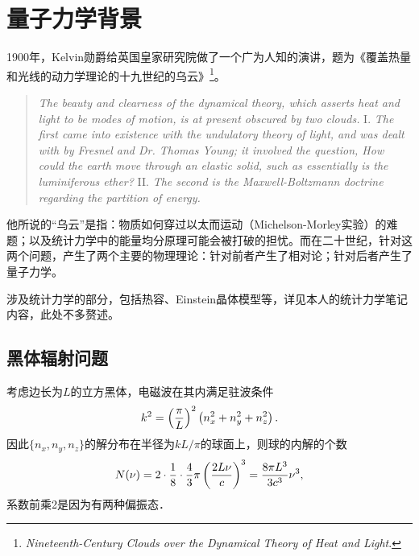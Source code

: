\def\coursename{量子力学}
\def\courseEnglishname{Quantum Mechanics}
\def\teachername{陈新、郭永}
\def\beginday{2022/3/25}



\lecturedeclaretrue

\let\oldr\r
\renewcommand*{\r}{\bm r}						%
\newcommand{\qo}[1]{\bm{\hat #1}\!\mathop{}}	%
\newcommand{\cmm}[2]{\zkh{\hat #1,\hat #2}}		%
\newcommand{\acmm}[2]{\{\hat #1,\hat #2\}}

\newcommand{\Larmor}{\mathrm L}
\newcommand{\Hall}{\mathrm H}

\newcommand{\cyc}{\mathrm c}
\DeclareMathOperator{\Cle}{C}



\firstandforemost

\setcounter{section}{-1}
\section{量子力学背景}
1900年，Kelvin勋爵给英国皇家研究院做了一个广为人知的演讲，题为《覆盖热量和光线的动力学理论的十九世纪的乌云》\footnote{\textit{Nineteenth-Century Clouds over the Dynamical Theory of Heat and Light}. }。
\begin{quote}
	\textit{The beauty and clearness of the dynamical theory, which asserts heat and light to be modes of motion, is at present obscured by two clouds.}
	I. \textit{The first came into existence with the undulatory theory of light, and was dealt with by Fresnel and Dr. Thomas Young; it involved the question, How could the earth move through an elastic solid, such as essentially is the luminiferous ether?}
	II. \textit{The second is the Maxwell-Boltzmann doctrine regarding the partition of energy.}
\end{quote}
他所说的“乌云”是指：物质如何穿过以太而运动（Michelson-Morley实验）的难题；以及统计力学中的能量均分原理可能会被打破的担忧。而在二十世纪，针对这两个问题，产生了两个主要的物理理论：针对前者产生了相对论；针对后者产生了量子力学。%

涉及统计力学的部分，包括热容、Einstein晶体模型等，详见本人的统计力学笔记内容，此处不多赘述。
\subsection{黑体辐射问题}
考虑边长为$L$的立方黑体，电磁波在其内满足驻波条件
\begin{align}
	k^2=\left(\frac\pi{L}\right)^2\left(n_x^2+n_y^2+n_z^2\right).
\end{align}
因此$\{n_x,n_y,n_z\}$的解分布在半径为$kL/\pi$的球面上，则球的内解的个数
\[
	N(\nu)=2\cdot\frac18\cdot\frac43\pi\left(\frac{2L\nu}c\right)^3=\frac{8\pi L^3}{3c^3}\nu^3,
\]
系数前乘2是因为有两种偏振态．

